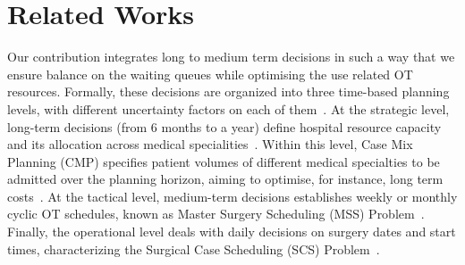 \documentclass[review,3p,authoryear]{elsarticle}
\begin{document}
\section{Related Works\label{sec:lit_review}}



Our contribution integrates long to medium term decisions in such a way that we ensure balance on the waiting queues while optimising the use related OT resources.
Formally, these decisions are organized into three time-based planning levels, with different uncertainty factors on each of them~\citep{Rahimi2020Review, Cardoen2010, wang2021operating, Melo2025}.
At the strategic level, long-term decisions (from 6 months to a year) define hospital resource capacity and its allocation across medical specialities~\citep{Fugener2015}.
Within this level, Case Mix Planning (CMP) specifies patient volumes of different medical specialties to be admitted over the planning horizon, aiming to optimise, for instance, long term costs~\citep{Hof2015Casemix, Mcrae2020}.
At the tactical level, medium-term decisions establishes weekly or monthly cyclic OT schedules, known as Master Surgery Scheduling (MSS) Problem~\citep{AlAmin2024Review, Carneiro2025}.
Finally, the operational level deals with daily decisions on surgery dates and start times, characterizing the Surgical Case Scheduling (SCS) Problem~\citep{Vieira2025, Harris2022}.
\end{document}
